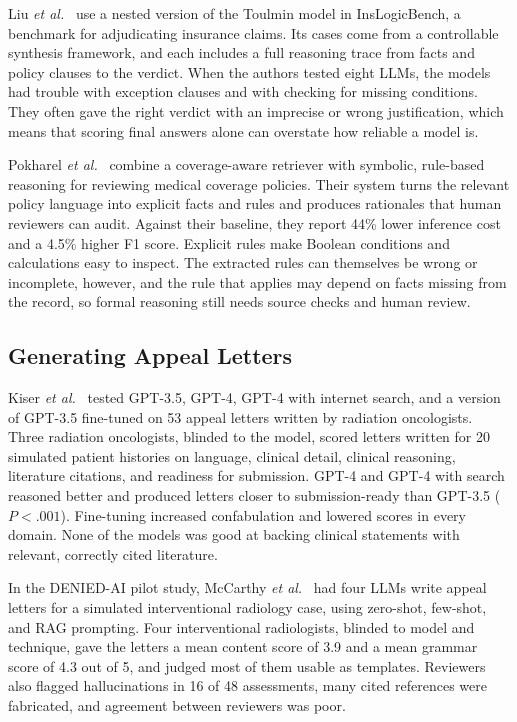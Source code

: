 \documentclass[conference]{IEEEtran}
\begin{document}
Liu \textit{et al.}~\cite{inslogicbench2026} use a nested version of the Toulmin model in InsLogicBench, a benchmark for adjudicating insurance claims. Its cases come from a controllable synthesis framework, and each includes a full reasoning trace from facts and policy clauses to the verdict. When the authors tested eight LLMs, the models had trouble with exception clauses and with checking for missing conditions. They often gave the right verdict with an imprecise or wrong justification, which means that scoring final answers alone can overstate how reliable a model is.

Pokharel \textit{et al.}~\cite{pokharel2026} combine a coverage-aware retriever with symbolic, rule-based reasoning for reviewing medical coverage policies. Their system turns the relevant policy language into explicit facts and rules and produces rationales that human reviewers can audit. Against their baseline, they report 44\% lower inference cost and a 4.5\% higher F1 score. Explicit rules make Boolean conditions and calculations easy to inspect. The extracted rules can themselves be wrong or incomplete, however, and the rule that applies may depend on facts missing from the record, so formal reasoning still needs source checks and human review.

\subsection{Generating Appeal Letters}
Kiser \textit{et al.}~\cite{kiser2024} tested GPT-3.5, GPT-4, GPT-4 with internet search, and a version of GPT-3.5 fine-tuned on 53 appeal letters written by radiation oncologists. Three radiation oncologists, blinded to the model, scored letters written for 20 simulated patient histories on language, clinical detail, clinical reasoning, literature citations, and readiness for submission. GPT-4 and GPT-4 with search reasoned better and produced letters closer to submission-ready than GPT-3.5 ($P < .001$). Fine-tuning increased confabulation and lowered scores in every domain. None of the models was good at backing clinical statements with relevant, correctly cited literature.

In the DENIED-AI pilot study, McCarthy \textit{et al.}~\cite{deniedai2026} had four LLMs write appeal letters for a simulated interventional radiology case, using zero-shot, few-shot, and RAG prompting. Four interventional radiologists, blinded to model and technique, gave the letters a mean content score of 3.9 and a mean grammar score of 4.3 out of 5, and judged most of them usable as templates. Reviewers also flagged hallucinations in 16 of 48 assessments, many cited references were fabricated, and agreement between reviewers was poor.
\end{document}
